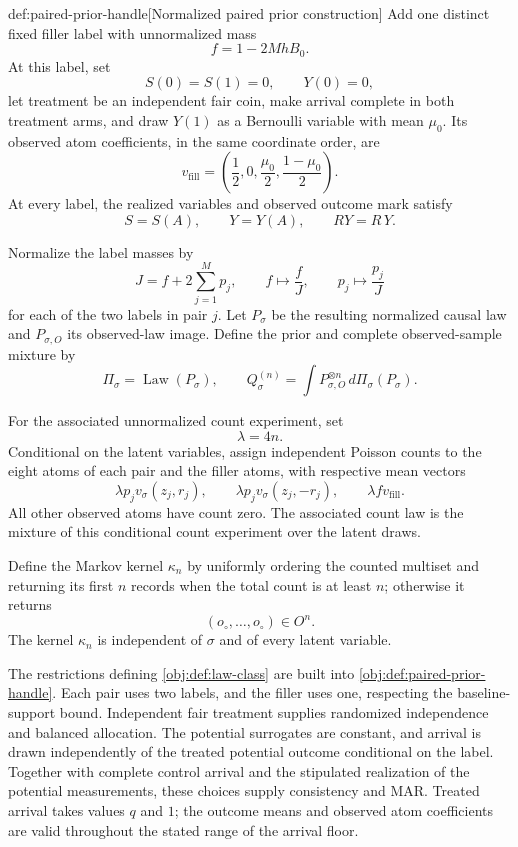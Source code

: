 \begin{definitionv}{def:paired-prior-handle}[Normalized paired prior construction]
Add one distinct fixed filler label with unnormalized mass
\[
f=1-2MhB_0.
\]
At this label, set
\[
S(0)=S(1)=0,\qquad Y(0)=0,
\]
let treatment be an independent fair coin, make arrival complete in both treatment arms, and draw \(Y(1)\) as a Bernoulli variable with mean \(\mu_0\). Its observed atom coefficients, in the same coordinate order, are
\[
v_{\mathrm{fill}}
=\left(\frac12,0,\frac{\mu_0}{2},\frac{1-\mu_0}{2}\right).
\]
At every label, the realized variables and observed outcome mark satisfy
\[
S=S(A),\qquad Y=Y(A),\qquad RY=R\,Y.
\]

Normalize the label masses by
\[
J=f+2\sum_{j=1}^{M}p_j,
\qquad
f\longmapsto\frac fJ,
\qquad
p_j\longmapsto\frac{p_j}{J}
\]
for each of the two labels in pair \(j\). Let \(P_{\sigma}\) be the resulting normalized causal law and \(P_{\sigma,O}\) its observed-law image. Define the prior and complete observed-sample mixture by
\[
\Pi_{\sigma}=\operatorname{Law}(P_{\sigma}),
\qquad
Q_{\sigma}^{(n)}
=\int P_{\sigma,O}^{\otimes n}\,d\Pi_{\sigma}(P_{\sigma}).
\]

For the associated unnormalized count experiment, set
\[
\lambda=4n.
\]
Conditional on the latent variables, assign independent Poisson counts to the eight atoms of each pair and the filler atoms, with respective mean vectors
\[
\lambda p_jv_{\sigma}(z_j,r_j),
\qquad
\lambda p_jv_{\sigma}(z_j,-r_j),
\qquad
\lambda f v_{\mathrm{fill}}.
\]
All other observed atoms have count zero. The associated count law is the mixture of this conditional count experiment over the latent draws.

Define the Markov kernel \(\kappa_n\) by uniformly ordering the counted multiset and returning its first \(n\) records when the total count is at least \(n\); otherwise it returns
\[
(o_{\circ},\ldots,o_{\circ})\in O^n.
\]
The kernel \(\kappa_n\) is independent of \(\sigma\) and of every latent variable.
\end{definitionv}

The restrictions defining \cref{obj:def:law-class} are built into \cref{obj:def:paired-prior-handle}. Each pair uses two labels, and the filler uses one, respecting the baseline-support bound. Independent fair treatment supplies randomized independence and balanced allocation. The potential surrogates are constant, and arrival is drawn independently of the treated potential outcome conditional on the label. Together with complete control arrival and the stipulated realization of the potential measurements, these choices supply consistency and MAR. Treated arrival takes values \(q\) and \(1\); the outcome means and observed atom coefficients are valid throughout the stated range of the arrival floor.

